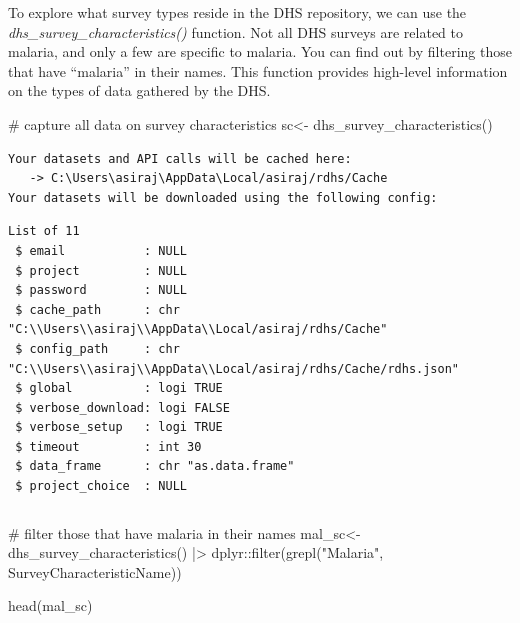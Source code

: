 \documentclass[
  letterpaper,
  DIV=11,
  numbers=noendperiod]{scrreprt}
\newenvironment{Shaded}{\begin{snugshade}}{\end{snugshade}}
\newcommand{\CommentTok}[1]{\textcolor[rgb]{0.37,0.37,0.37}{#1}}
\newcommand{\FunctionTok}[1]{\textcolor[rgb]{0.28,0.35,0.67}{#1}}
\newcommand{\NormalTok}[1]{\textcolor[rgb]{0.00,0.23,0.31}{#1}}
\newcommand{\OtherTok}[1]{\textcolor[rgb]{0.00,0.23,0.31}{#1}}
\newcommand{\SpecialCharTok}[1]{\textcolor[rgb]{0.37,0.37,0.37}{#1}}
\newcommand{\StringTok}[1]{\textcolor[rgb]{0.13,0.47,0.30}{#1}}
\begin{document}
To explore what survey types reside in the DHS repository, we can use
the \emph{dhs\_survey\_characteristics()} function. Not all DHS surveys
are related to malaria, and only a few are specific to malaria. You can
find out by filtering those that have ``malaria'' in their names. This
function provides high-level information on the types of data gathered
by the DHS.

\begin{Shaded}
\begin{Highlighting}[]
\CommentTok{\# capture all data on survey characteristics }
\NormalTok{sc}\OtherTok{\textless{}{-}} \FunctionTok{dhs\_survey\_characteristics}\NormalTok{()}
\end{Highlighting}
\end{Shaded}

\begin{verbatim}
Your datasets and API calls will be cached here: 
   -> C:\Users\asiraj\AppData\Local/asiraj/rdhs/Cache
Your datasets will be downloaded using the following config:
\end{verbatim}

\begin{verbatim}
List of 11
 $ email           : NULL
 $ project         : NULL
 $ password        : NULL
 $ cache_path      : chr "C:\\Users\\asiraj\\AppData\\Local/asiraj/rdhs/Cache"
 $ config_path     : chr "C:\\Users\\asiraj\\AppData\\Local/asiraj/rdhs/Cache/rdhs.json"
 $ global          : logi TRUE
 $ verbose_download: logi FALSE
 $ verbose_setup   : logi TRUE
 $ timeout         : int 30
 $ data_frame      : chr "as.data.frame"
 $ project_choice  : NULL
\end{verbatim}

\begin{verbatim}
\end{verbatim}

\begin{Shaded}
\begin{Highlighting}[]
\CommentTok{\# filter those that have \textquotesingle{}malaria\textquotesingle{} in their names}
\NormalTok{mal\_sc}\OtherTok{\textless{}{-}}  \FunctionTok{dhs\_survey\_characteristics}\NormalTok{() }\SpecialCharTok{|\textgreater{}}
\NormalTok{  dplyr}\SpecialCharTok{::}\FunctionTok{filter}\NormalTok{(}\FunctionTok{grepl}\NormalTok{(}\StringTok{"Malaria"}\NormalTok{, SurveyCharacteristicName)) }

\FunctionTok{head}\NormalTok{(mal\_sc)}
\end{Highlighting}
\end{Shaded}
\end{document}
